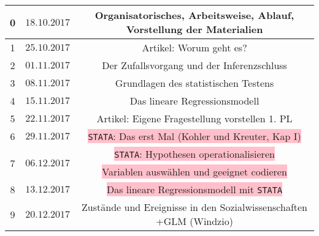 \documentclass[a4paper,fontsize=14pt]{article}
\begin{document}
\begin{table}[h]
\begin{center}
\begin{tabular}{|c|c|c|}
    0 &   $18.10.2017$   &    Organisatorisches, Arbeitsweise, Ablauf, Vorstellung der Materialien  \\ \hline
     1 &  $25.10.2017$     &  \colorbox{green!50}{Artikel: Worum geht es?} \\ \hline
    2 &   $01.11.2017$   &   \colorbox{yellow!60}{ Der Zufallsvorgang und der Inferenzschluss }  \\ \hline
    3 &   $08.11.2017$  &    \colorbox{yellow!60}{Grundlagen des statistischen Testens}\\ \hline
    4 &   $15.11.2017$   &  \colorbox{yellow!60}{Das lineare Regressionsmodell } \\ \hline
    5 &   $22.11.2017$     & \colorbox{green!50}{Artikel: Eigene Fragestellung vorstellen} \colorbox{red!70}{1. PL} \\ \hline
    6 &   $29.11.2017$   &   \colorbox{pink}{\texttt{STATA}: Das erst Mal (Kohler und Kreuter, Kap I)}\\ \hline
  \multirow{2}{*}{7} &  \multirow{2}{*}{$06.12.2017$}& \colorbox{pink}{\texttt{STATA}: Hypothesen operationalisieren
  } \\
                   &        & \colorbox{pink}{Variablen auswählen und geeignet codieren}\\ \hline  
    8 & $13.12.2017$      &  \colorbox{pink}{Das lineare Regressionsmodell  mit \texttt{STATA} }  \\ \hline   %
    9 & $20.12.2017$     &  \colorbox{yellow!60}{Zustände und Ereignisse in den Sozialwissenschaften +GLM (Windzio)}  \\ \hline
  \end{tabular}
  \end{center}
  \label{tab:multicol}
 \end{table}
 
\end{document}
